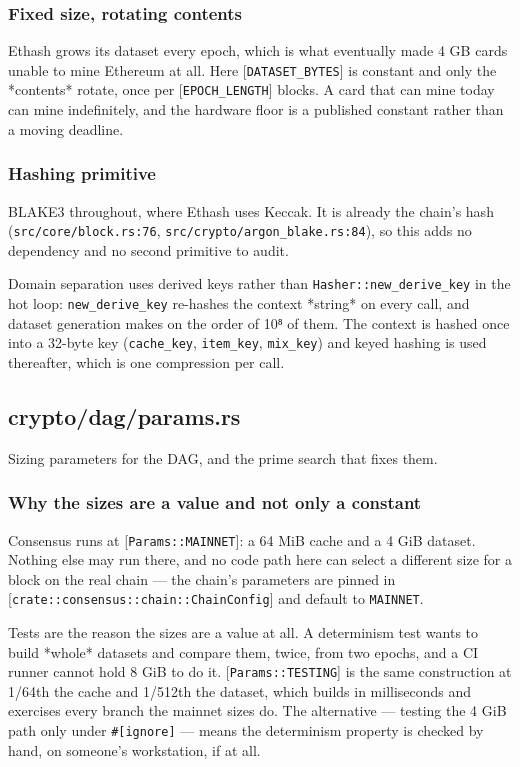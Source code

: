\documentclass[11pt,a4paper]{article}
\begin{document}
\subsubsection{Fixed size, rotating contents}

Ethash grows its dataset every epoch, which is what eventually made 4 GB
cards unable to mine Ethereum at all. Here [\texttt{DATASET\_BYTES}] is constant and
only the *contents* rotate, once per [\texttt{EPOCH\_LENGTH}] blocks. A card that
can mine today can mine indefinitely, and the hardware floor is a published
constant rather than a moving deadline.

\subsubsection{Hashing primitive}

BLAKE3 throughout, where Ethash uses Keccak. It is already the chain's hash
(\texttt{src/core/block.rs:76}, \texttt{src/crypto/argon\_blake.rs:84}), so this adds no
dependency and no second primitive to audit.

Domain separation uses derived keys rather than \texttt{Hasher::new\_derive\_key} in
the hot loop: \texttt{new\_derive\_key} re-hashes the context *string* on every call,
and dataset generation makes on the order of 10⁸ of them. The context is
hashed once into a 32-byte key (\texttt{cache\_key}, \texttt{item\_key}, \texttt{mix\_key})
and keyed hashing is used thereafter, which is one compression per call.

\subsection{crypto/dag/params.rs}
Sizing parameters for the DAG, and the prime search that fixes them.

\subsubsection{Why the sizes are a value and not only a constant}

Consensus runs at [\texttt{Params::MAINNET}]: a 64 MiB cache and a 4 GiB dataset.
Nothing else may run there, and no code path here can select a different
size for a block on the real chain — the chain's parameters are pinned in
[\texttt{crate::consensus::chain::ChainConfig}] and default to \texttt{MAINNET}.

Tests are the reason the sizes are a value at all. A determinism test wants
to build *whole* datasets and compare them, twice, from two epochs, and a CI
runner cannot hold 8 GiB to do it. [\texttt{Params::TESTING}] is the same
construction at 1/64th the cache and 1/512th the dataset, which builds in
milliseconds and exercises every branch the mainnet sizes do. The alternative
— testing the 4 GiB path only under \texttt{\#[ignore]} — means the determinism
property is checked by hand, on someone's workstation, if at all.
\end{document}
